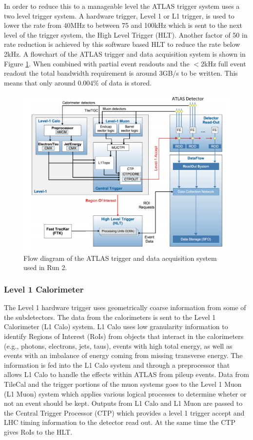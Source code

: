 In order to reduce this to a manageable level the ATLAS trigger system uses a two level trigger system.  A hardware trigger, Level 1 or L1 trigger, is used to lower the rate from 40MHz to between 75 and 100kHz which is sent to the next level of the trigger system, the High Level Trigger (HLT).  Another factor of 50 in rate reduction is achieved by this software based HLT to reduce the rate below 2kHz.  A flowchart of the ATLAS trigger and data acquisition system is shown in Figure \ref{fig:ATLAStdaq}.  When combined with partial event readouts and the $<$2kHz full event readout the total bandwidth requirement is around 3GB/s to be written.  This means that only around $0.004\%$ of data is stored.
\begin{figure}[h!]
	\centering
	\includegraphics[width=\columnwidth]{../ThesisImages/LHCImages/ATLASTDAQR2.png}
	\caption[Flow diagram of the ATLAS trigger and data acquisition system used in Run 2.]{Flow diagram of the ATLAS trigger and data acquisition system used in Run 2.\cite{ATLASTDAQ}
	}
	\label{fig:ATLAStdaq}
\end{figure}

\subsubsection{Level 1 Calorimeter}
The Level 1 hardware trigger uses geometrically coarse information from some of the subdetectors.  The data from the calorimeters is sent to the Level 1 Calorimeter (L1 Calo) system.  L1 Calo uses low granularity information to identify Regions of Interest (RoIs) from objects that interact in the calorimeters (e.g., photons, electrons, jets, taus), events with high total energy, as well as events with an imbalance of energy coming from missing transverse energy.  The information is fed into the L1 Calo system and through a preprocessor that allows L1 Calo to handle the effects within ATLAS from pileup events.
Data from TileCal and the trigger portions of the muon systems goes to the Level 1 Muon (L1 Muon) system which applies various logical processes to determine wheter or not an event should be kept.  
Outputs from L1 Calo and L1 Muon are passed to the Central Trigger Processor (CTP) which provides a level 1 trigger accept and LHC timing information to the detector read out.  At the same time the CTP gives RoIs to the HLT.

